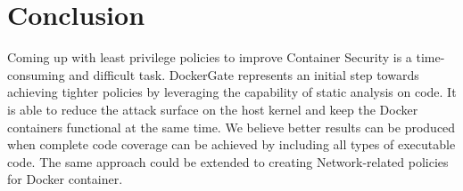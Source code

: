 \section{Conclusion}
\label{sec:conc}

Coming up with least privilege policies to improve Container Security is a time-consuming and difficult task. DockerGate represents an initial step towards achieving tighter policies by leveraging the capability of static analysis on code. It is able to reduce the attack surface on the host kernel and keep the Docker containers functional at the same time. We believe better results can be produced when complete code coverage can be achieved by including all types of executable code. The same approach could be extended to creating Network-related policies for Docker container.  